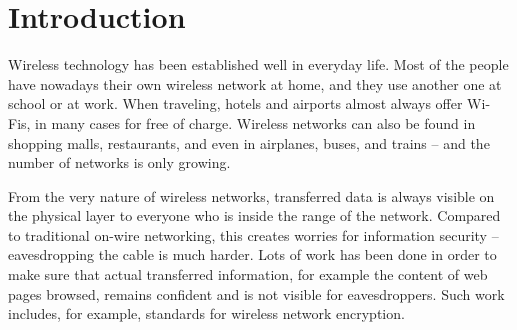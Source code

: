 \documentclass[12pt,a4paper,oneside,pdftex]{report}
\begin{document}


\label{pages-prelude}
\cleardoublepage

\startfirstchapter

\pagestyle{headings}




\chapter{Introduction}
\label{chapter:intro}

Wireless technology has been established well in everyday life. Most of the people have nowadays their own wireless network at home, and they use another one at school or at work. When traveling, hotels and airports almost always offer Wi-Fis, in many cases for free of charge. Wireless networks can also be found in shopping malls, restaurants, and even in airplanes, buses, and trains -- and the number of networks is only growing.

From the very nature of wireless networks, transferred data is always visible on the physical layer to everyone who is inside the range of the network. Compared to traditional on-wire networking, this creates worries for information security -- eavesdropping the cable is much harder. Lots of work has been done in order to make sure that actual transferred information, for example the content of web pages browsed, remains confident and is not visible for eavesdroppers. Such work includes, for example, standards for wireless network encryption.
\end{document}
